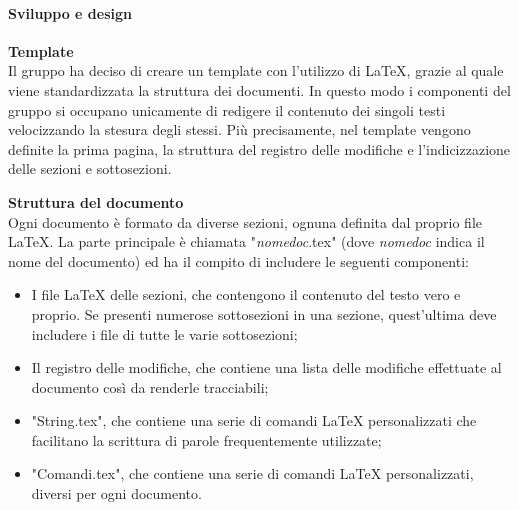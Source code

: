\paragraph{Sviluppo e design}  \label{pdp}

\textbf{Template}\\
Il gruppo ha deciso di creare un template con l'utilizzo di \LaTeX{}, grazie al quale viene standardizzata la struttura dei documenti. In questo modo i componenti del gruppo si occupano unicamente di redigere il contenuto dei singoli testi velocizzando la stesura degli stessi. Più precisamente, nel template vengono definite la prima pagina, la struttura del registro delle modifiche e l'indicizzazione delle sezioni e sottosezioni. \\ \mbox{}

\textbf{Struttura del documento}\\
Ogni documento è formato da diverse sezioni, ognuna definita dal proprio file \LaTeX. La parte principale è chiamata "\textit{nomedoc}.tex" (dove \textit{nomedoc} indica il nome del documento) ed ha il compito di includere le seguenti componenti:
\begin{itemize}
	\item I file \LaTeX{} delle sezioni, che contengono il contenuto del testo vero e proprio. Se presenti numerose sottosezioni in una sezione, quest'ultima deve includere i file di tutte le varie sottosezioni;
	
	\item Il registro delle modifiche, che contiene una lista delle modifiche effettuate al documento così da renderle tracciabili;
	
	\item "String.tex", che contiene una serie di comandi \LaTeX{} personalizzati che facilitano la scrittura di parole frequentemente utilizzate;
	
	\item "Comandi.tex", che contiene una serie di comandi \LaTeX{} personalizzati, diversi per ogni documento.
\end{itemize}

\mbox{}


